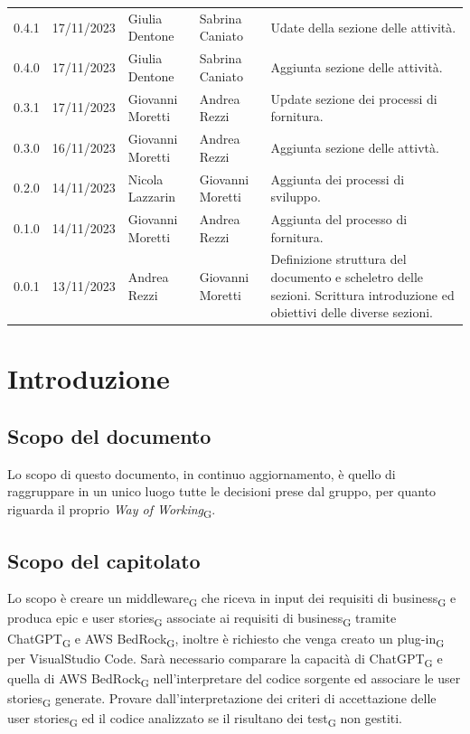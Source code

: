 \documentclass{article}
\begin{document}
\begin{center}
\begin{tabular}{P{4em} P{6em} P{8em} P{8em} P{10em}} 
    0.4.1 & 17/11/2023 & Giulia Dentone & Sabrina Caniato & Udate della sezione delle attività.\\
    0.4.0 & 17/11/2023 & Giulia Dentone & Sabrina Caniato & Aggiunta sezione delle attività. \\
    0.3.1 & 17/11/2023 & Giovanni Moretti & Andrea Rezzi & Update sezione dei processi di fornitura.\\
    0.3.0 & 16/11/2023 & Giovanni Moretti & Andrea Rezzi & Aggiunta sezione delle attivtà. \\
    0.2.0 & 14/11/2023 & Nicola Lazzarin & Giovanni Moretti & Aggiunta dei processi di sviluppo. \\
    0.1.0 & 14/11/2023 & Giovanni Moretti & Andrea Rezzi & Aggiunta del processo di fornitura.\\
    0.0.1 & 13/11/2023 & Andrea Rezzi & Giovanni Moretti & Definizione struttura del documento e scheletro delle sezioni. Scrittura introduzione ed obiettivi delle diverse sezioni.\\
\end{tabular}
\end{center}
\newpage
\tableofcontents
\newpage

\section{Introduzione}

\subsection{Scopo del documento}
Lo scopo di questo documento, in continuo aggiornamento, è quello di raggruppare in un unico luogo tutte le decisioni prese dal gruppo, per quanto riguarda il proprio \textit{Way of Working}\textsubscript{G}.

\subsection{Scopo del capitolato}
Lo scopo è creare un middleware\textsubscript{G} che riceva in input dei requisiti di business\textsubscript{G} e produca epic e user stories\textsubscript{G} associate ai requisiti di business\textsubscript{G} tramite ChatGPT\textsubscript{G} e AWS BedRock\textsubscript{G}, inoltre è richiesto che venga creato un plug-in\textsubscript{G} per VisualStudio Code.
Sarà necessario comparare la capacità di ChatGPT\textsubscript{G} e quella di AWS BedRock\textsubscript{G} nell'interpretare del codice sorgente ed associare le user stories\textsubscript{G} generate. Provare dall'interpretazione dei criteri di accettazione delle user stories\textsubscript{G} ed il codice analizzato se il risultano dei test\textsubscript{G} non gestiti.
\end{document}
